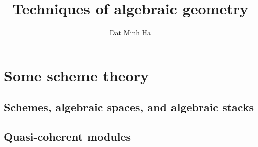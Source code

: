 

\setcounter{chapter}{-1}





    \title{Techniques of algebraic geometry}
    
    \author{Dat Minh Ha}
    \maketitle
    
    {
      \hypersetup{} 
      \dominitoc
      \tableofcontents %
    }

    \listoftodos

    
    
    \part{Some scheme theory}
        \chapter{Schemes, algebraic spaces, and algebraic stacks}
            \begin{abstract}
                
            \end{abstract}
            
            \minitoc

            

            

            
        
        \chapter{Quasi-coherent modules}
            \begin{abstract}
                
            \end{abstract}
            
            \minitoc

            

